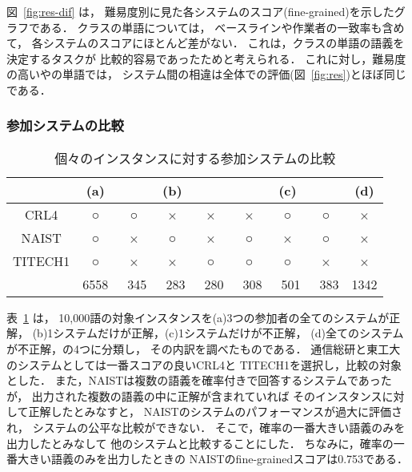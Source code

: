 図~\ref{fig:res-dif} は，
難易度別に見た各システムのスコア(fine-grained)を示したグラフである．
クラス\clC の単語については，
ベースラインや作業者の一致率も含めて，
各システムのスコアにほとんど差がない．
これは，クラス\clC の単語の語義を決定するタスクが
比較的容易であったためと考えられる．
これに対し，難易度の高い\clA や\clB の単語では，
システム間の相違は全体での評価(図~\ref{fig:res})とほぼ同じである．

\subsubsection{参加システムの比較}
\label{sec:comparing systems}

\begin{table}[tbp]
{\normalsize
  \begin{center}
    \caption{個々のインスタンスに対する参加システムの比較}
    \label{tab:comparing systems}

    \medskip

    \begin{tabular}{|c||c|ccc|ccc|c|} \hline
      & \multicolumn{1}{c|}{(a)} & \multicolumn{3}{c|}{(b)} &
        \multicolumn{3}{c|}{(c)} & \multicolumn{1}{c|}{(d)} \\ \hline
      CRL4    & ○ & ○ & × & × & × & ○ & ○ & × \\[-1mm]
      NAIST   & ○ & × & ○ & × & ○ & × & ○ & × \\[-1mm]
      TITECH1 & ○ & × & × & ○ & ○ & ○ & × & × \\ \hline
      & 6558 & ~345 & ~283 & ~280 & ~308 & ~501 & ~383 & 1342 \\\hline
    \end{tabular}
  \end{center}
}
\end{table}

表~\ref{tab:comparing systems} は，
10,000語の対象インスタンスを(a)3つの参加者の全てのシステムが正解，
(b)1システムだけが正解，(c)1システムだけが不正解，
(d)全てのシステムが不正解，の4つに分類し，
その内訳を調べたものである．
通信総研と東工大のシステムとしては一番スコアの良いCRL4と
TITECH1を選択し，比較の対象とした．
また，NAISTは複数の語義を確率付きで回答するシステムであったが，
出力された複数の語義の中に正解が含まれていれば
そのインスタンスに対して正解したとみなすと，
NAISTのシステムのパフォーマンスが過大に評価され，
システムの公平な比較ができない．
そこで，確率の一番大きい語義のみを出力したとみなして
他のシステムと比較することにした．
ちなみに，確率の一番大きい語義のみを出力したときの
NAISTのfine-grainedスコアは0.753である．

